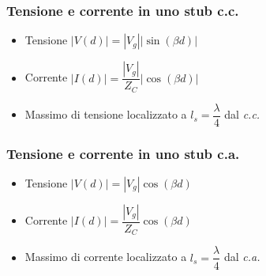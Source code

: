 \documentclass{article}
\begin{document}
\subsubsection{Tensione e corrente in uno stub c.c.}
\begin{itemize}
	\item Tensione \( |V(d)| = \left| V_g \right| \left|\sin(\beta d)\right| \)
	\item Corrente \( |I(d)| = \dfrac{|V_g|}{Z_C} |\cos (\beta d) |\)
	\item Massimo di tensione localizzato a \( l_s = \dfrac{\lambda}{4} \) dal \textit{c.c.}
\end{itemize}

\subsubsection{Tensione e corrente in uno stub c.a.}
\begin{itemize}
	\item Tensione \( |V(d)| = \left|V_g\right| \cos(\beta d) \)
	\item Corrente \( |I(d)| = \dfrac{\left|V_g\right|}{Z_C} \cos(\beta d) \)
	\item Massimo di corrente localizzato a \(l_s =  \dfrac{\lambda}{4} \) dal \textit{c.a.}
\end{itemize}
\end{document}
